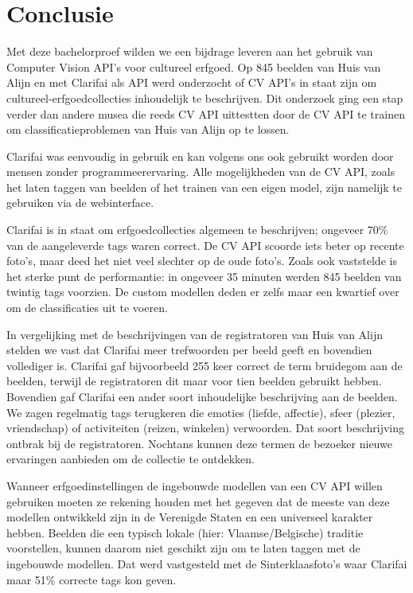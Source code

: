 
\chapter{Conclusie}
\label{ch:conclusie}

Met deze bachelorproef wilden we een bijdrage leveren aan het gebruik van Computer Vision API's voor cultureel erfgoed. Op 845 beelden van Huis van Alijn en met Clarifai als API werd onderzocht of CV API’s in staat zijn om cultureel-erfgoedcollecties inhoudelijk te beschrijven. Dit onderzoek ging een stap verder dan andere musea die reeds CV API uittestten door de CV API te trainen om classificatieproblemen van Huis van Alijn op te lossen.

Clarifai was eenvoudig in gebruik en kan volgens ons ook gebruikt worden door mensen zonder programmeerervaring. Alle mogelijkheden van de CV API, zoals het laten taggen van beelden of het trainen van een eigen model, zijn namelijk te gebruiken via de webinterface.

Clarifai is in staat om erfgoedcollecties algemeen te beschrijven; ongeveer 70\% van de aangeleverde tags waren correct. De CV API scoorde iets beter op recente foto’s, maar deed het niet veel slechter op de oude foto’s. Zoals ook \textcite{Vanstappen2019} vaststelde is het sterke punt de performantie: in ongeveer 35 minuten werden 845 beelden van twintig tags voorzien. De custom modellen deden er zelfs maar een kwartief over om de classificaties uit te voeren.

In vergelijking met de beschrijvingen van de registratoren van Huis van Alijn stelden we vast dat Clarifai meer trefwoorden per beeld geeft en bovendien vollediger is. Clarifai gaf bijvoorbeeld 255 keer correct de term bruidegom aan de beelden, terwijl de registratoren dit maar voor tien beelden gebruikt hebben. Bovendien gaf Clarifai een ander soort inhoudelijke beschrijving aan de beelden. We zagen regelmatig tags terugkeren die emoties (liefde, affectie), sfeer (plezier, vriendschap) of activiteiten (reizen, winkelen) verwoorden. Dat soort beschrijving ontbrak bij de registratoren. Nochtans kunnen deze termen de bezoeker nieuwe ervaringen aanbieden om de collectie te ontdekken.

Wanneer erfgoedinstellingen de ingebouwde modellen van een CV API willen gebruiken moeten ze rekening houden met het gegeven dat de meeste van deze modellen ontwikkeld zijn in de Verenigde Staten en een universeel karakter hebben. Beelden die een typisch lokale (hier: Vlaamse/Belgische) traditie voorstellen, kunnen daarom niet geschikt zijn om te laten taggen met de ingebouwde modellen. Dat werd vastgesteld met de Sinterklaasfoto’s waar Clarifai maar 51\% correcte tags kon geven. 

